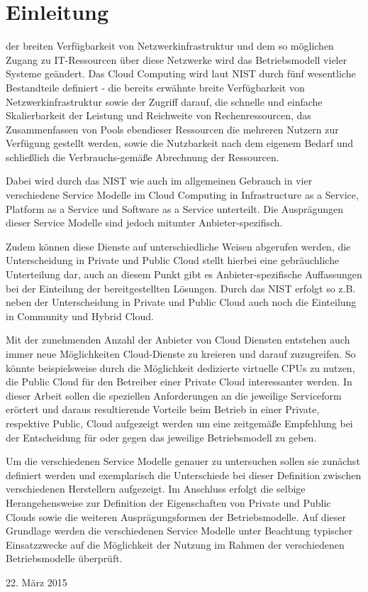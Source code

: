 \section{Einleitung}
\label{sec_introduction}

 der breiten Verfügbarkeit von Netzwerkinfrastruktur und dem so möglichen Zugang zu IT-Ressourcen über diese Netzwerke wird das Betriebsmodell vieler Systeme geändert. Das Cloud Computing wird laut NIST durch fünf wesentliche Bestandteile definiert - die bereits erwähnte breite Verfügbarkeit von Netzwerkinfrastruktur sowie der Zugriff darauf, die schnelle und einfache Skalierbarkeit der Leistung und Reichweite von Rechenressourcen, das Zusammenfassen von Pools ebendieser Ressourcen die mehreren Nutzern zur Verfügung gestellt werden, sowie die Nutzbarkeit nach dem eigenem Bedarf und schließlich die Verbrauchs-gemäße Abrechnung der Ressourcen.

Dabei wird durch das NIST wie auch im allgemeinen Gebrauch in vier verschiedene Service Modelle im Cloud Computing in Infrastructure as a Service, Platform as a Service und Software as a Service unterteilt. Die Ausprägungen dieser Service Modelle sind jedoch mitunter Anbieter-spezifisch.

Zudem können diese Dienste auf unterschiedliche Weisen abgerufen werden, die Unterscheidung in Private und Public Cloud stellt hierbei eine gebräuchliche Unterteilung dar, auch an diesem Punkt gibt es Anbieter-spezifische Auffassungen bei der Einteilung der bereitgestellten Lösungen. Durch das NIST erfolgt so z.B. neben der Unterscheidung in Private und Public Cloud auch noch die Einteilung in Community und Hybrid Cloud.

Mit der zunehmenden Anzahl der Anbieter von Cloud Diensten entstehen auch immer neue Möglichkeiten Cloud-Dienste zu kreieren und darauf zuzugreifen. So könnte beispielsweise durch die Möglichkeit dedizierte virtuelle CPUs zu nutzen, die Public Cloud für den Betreiber einer Private Cloud interessanter werden. In dieser Arbeit sollen die speziellen Anforderungen an die jeweilige Serviceform erörtert und daraus resultierende Vorteile beim Betrieb in einer Private, respektive Public, Cloud aufgezeigt werden um eine zeitgemäße Empfehlung bei der Entscheidung für oder gegen das jeweilige Betriebsmodell zu geben. 

Um die verschiedenen Service Modelle genauer zu untersuchen sollen sie zunächst definiert werden und exemplarisch die Unterschiede bei dieser Definition zwischen verschiedenen Herstellern aufgezeigt. Im Anschluss erfolgt die selbige Herangehensweise zur Definition der Eigenschaften von Private und Public Clouds sowie die weiteren Ausprägungsformen der Betriebsmodelle. Auf dieser Grundlage werden die verschiedenen Service Modelle unter Beachtung typischer Einsatzzwecke auf die Möglichkeit der Nutzung im Rahmen der verschiedenen Betriebsmodelle überprüft.

\hfill 22. März 2015